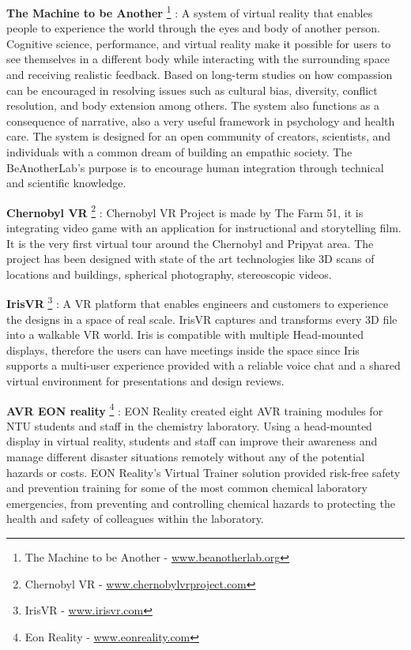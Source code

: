 \textbf{The Machine to be Another} \footnote{The Machine to be Another - \url{www.beanotherlab.org}} : A system of virtual reality that enables people to experience the world through the eyes and body of another person. Cognitive science, performance, and virtual reality make it possible for users to see themselves in a different body while interacting with the surrounding space and receiving realistic feedback. Based on long-term studies on how compassion can be encouraged in resolving issues such as cultural bias, diversity, conflict resolution, and body extension among others. The system also functions as a consequence of narrative, also a very useful framework in psychology and health care.
The system is designed for an open community of creators, scientists, and individuals with a common dream of building an empathic society. The BeAnotherLab's purpose is to encourage human integration through technical and scientific knowledge.

\textbf{Chernobyl VR} \footnote{Chernobyl VR - \url{www.chernobylvrproject.com}} : Chernobyl VR Project is made by The Farm 51,  it is integrating video game with an application for instructional and storytelling film. It is the very first virtual tour around the Chernobyl and Pripyat area. The project has been designed with state of the art technologies like 3D scans of locations and buildings, spherical photography, stereoscopic videos. 


\textbf{IrisVR} \footnote{IrisVR - \url{www.irisvr.com}} : A VR platform that enables engineers and customers to experience the designs in a space of real scale. IrisVR captures and transforms every 3D file into a walkable VR world. Iris is compatible with multiple Head-mounted displays, therefore the users can have meetings inside the space since Iris supports a multi-user experience provided with a reliable voice chat and a shared virtual environment for presentations and design reviews.


\textbf{AVR EON reality} \footnote{Eon Reality - \url{www.eonreality.com}} : EON Reality created eight AVR training modules for NTU students and staff in the chemistry laboratory. Using a head-mounted display in virtual reality, students and staff can improve their awareness and manage different disaster situations remotely without any of the potential hazards or costs. EON Reality's Virtual Trainer solution provided risk-free safety and prevention training for some of the most common chemical laboratory emergencies, from preventing and controlling chemical hazards to protecting the health and safety of colleagues within the laboratory.

